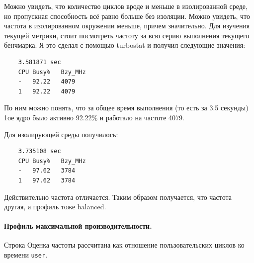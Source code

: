 \documentclass[a4paper,12pt]{article}
\begin{document}
Можно увидеть, что количество циклов вроде и меньше в изолированной среде, но пропускная 
способность всё равно больше без изоляции. Можно увидеть, что частота в
изолированном окружении меньше, причем значительно. Для изучения текущей
метрики, стоит посмотреть частоту за всю серию выполнения текущего бенчмарка. Я
это сделал с помощью turbostat и получил следующие значения:
\begin{verbatim}
    3.581871 sec
    CPU	Busy%	Bzy_MHz
    -	92.22	4079
    1	92.22	4079
\end{verbatim}

По ним можно понять, что за общее время выполнения (то есть за 3.5 секунды) 1ое
ядро было активно 92.22\% и работало на частоте 4079. 

Для изолирующей среды получилось:
\begin{verbatim}
    3.735108 sec
    CPU	Busy%	Bzy_MHz
    -	97.62	3784
    1	97.62	3784
\end{verbatim}
Действительно частота отличается. Таким образом получается, что частота другая,
а профиль тоже balanced. 

\paragraph{Профиль максимальной производительности.}

Строка Оценка частоты рассчитана как отношение пользовательских
циклов ко времени \texttt{user}.
\end{document}
